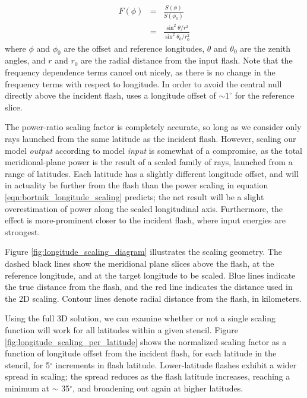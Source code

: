 \begin{eqnarray}
F(\phi) & = & \frac{S(\phi)}{S(\phi_0)} \\
& = & \frac{\sin^2\theta/r^2}{\sin^2\theta_0/r_0^2}
\label{eqn:bortnik_longitude_scaling}
\end{eqnarray}
\noindent where $\phi$ and $\phi_0$ are the offset and reference longitudes, $\theta$ and $\theta_0$ are the zenith angles, and $r$ and $r_0$ are the radial distance from the input flash. Note that the frequency dependence terms cancel out nicely, as there is no change in the frequency terms with respect to longitude. In order to avoid the central null directly above the incident flash, \citeauthor{Bortnik2005} uses a longitude offset of $\sim 1^\circ$ for the reference slice.

The power-ratio scaling factor is completely accurate, so long as we consider only rays launched from the same latitude as the incident flash. However, scaling our model \emph{output} according to model \emph{input} is somewhat of a compromise, as the total meridional-plane power is the result of a scaled family of rays, launched from a range of latitudes. Each latitude has a slightly different longitude offset, and will in actuality be further from the flash than the power scaling in equation \eqref{eqn:bortnik_longitude_scaling} predicts; the net result will be a slight overestimation of power along the scaled longitudinal axis. Furthermore, the effect is more-prominent closer to the incident flash, where input energies are strongest. 

Figure \ref{fig:longitude_scaling_diagram} illustrates the scaling geometry. The dashed black lines show the meridional plane slices above the flash, at the reference longitude, and at the target longitude to be scaled. Blue lines indicate the true distance from the flash, and the red line indicates the distance used in the 2D scaling. Contour lines denote radial distance from the flash, in kilometers. 

Using the full 3D solution, we can examine whether or not a single scaling function will work for all latitudes within a given stencil. Figure \ref{fig:longitude_scaling_per_latitude} shows the normalized scaling factor as a function of longitude offset from the incident flash, for each latitude in the stencil, for 5$^\circ$ increments in flash latitude. Lower-latitude flashes exhibit a wider spread in scaling; the spread reduces as the flash latitude increases, reaching a minimum at $\sim$ 35$^\circ$, and broadening out again at higher latitudes.

